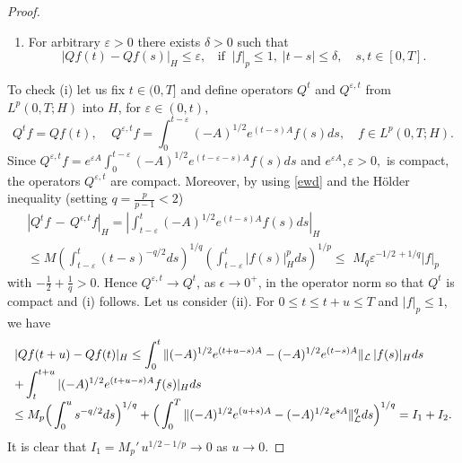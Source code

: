 \documentclass[preprint]{imsart}
\def\ds{\displaystyle}
\begin{document}
\begin{proof}
\begin{enumerate}
\item[(ii)] For arbitrary $\varepsilon >0$ there exists
$\delta >0$ such that
\begin{equation}
|{Q}f(t)-{Q}f(s)|_H \leq
\varepsilon,\;\; \text { if}\; \;  |f |_{p}\leq
1, \; |t-s|\leq \delta,\quad s,t \in [0,T].
\label{e8.17}
\end{equation}
\end{enumerate}
 To check (i)
let us fix $t \in (0,T]$ and define operators $Q^t $  and  $    Q^{\varepsilon,t }$ from  $L^{p}(0,T;H)$ into $H$, for
$\varepsilon  \in (0,t)$, 
\begin{displaymath}
{Q}^{t}f= Qf (t),\;\; \;\;
{Q}^{\varepsilon ,t}f=\int_{0}^{t-
\varepsilon } (-A)^{1/2} e^{(t-s)A} f(s)ds,\quad f \in
L^{p}(0,T;H).
\end{displaymath}
Since
 $
  {Q}^{\varepsilon ,t}f=e^{\varepsilon
A}\int_{0}^{t-\varepsilon } (-A)^{1/2} e^{(t-
\varepsilon -s) A}f(s)ds
$
and $e^{\varepsilon A},\varepsilon >0,$ is
compact, the  operators
${Q}^{\varepsilon ,t}$ are compact.
 Moreover, 
by using \eqref{ewd} and the 
H\"{o}lder inequality  (setting $q=\frac{p}{p-1} <2$)
\begin{displaymath}
 \begin{array}{l}
 \ds |{Q}^t f \, - \, {Q}^{\epsilon,t}f|_H =\left|\int_{t-\varepsilon }^{t } (-A)^{1/2} e^{(t-s)A}f(s)ds\right|_H 
\\ 
 \ds \leq M \left(\int_{t-\varepsilon }^{t }(t-
s)^{ - q/2}ds
\right)^{1/q}\left( \int_{t-\varepsilon }^{t} | f(s)|^{p}_H ds
\right)^{1/p} 
{   \le } \, \,  M_q \varepsilon ^{-1/2 \,  +1/q  } |f|_{p}
\end{array}
\end{displaymath}
with $ -\frac{1}{2} +  \frac{1}{q}  >0 $.  Hence
$Q^{\varepsilon,t  } \rightarrow
{{Q}^t} $, as $\epsilon \to 0^+$, in the operator norm so that
${Q}^t$ is compact and
(i) follows. Let us consider (ii).
For $0\leq t \leq t+u \leq T$ and $|f|_{p}\leq
1$, we have
\begin{displaymath}
 \begin{array}{l}
\ds |{Q}f(t+u)-{Q}f(t)|_H     
 \leq \int_{0}^{t} \|(-A)^{1/2} e^{(t+u-s)A} - 
(-A)^{1/2} e^{(t-s)A}\|_{\cal L}\,   |f(s)|_H ds 
 \\
\ds+\int_{t}^{t+u}| (-A)^{1/2}   e^{(t+u-s)A} f(s)|_H ds 
 \\
 \ds
 \le {   M_p} \Big(   \int_{0}^{u} s^{-q /2}ds
\Big)^{1/q}
+ 
 \Big( \int_{0}^{T} \|(-A)^{1/2} e^{(u+s)A}-  (-A)^{1/2}  e^{sA} \|^{q}_{\cal L} ds
\Big)^{1/q }   = I_1 + I_2.   
\end{array}
\end{displaymath}
It is clear that $I_{1} = M_p' \,   u^{1/2 -
1/p}      \rightarrow 0$ as
$u\rightarrow 0$. 
    

\end{proof}
\end{document}
